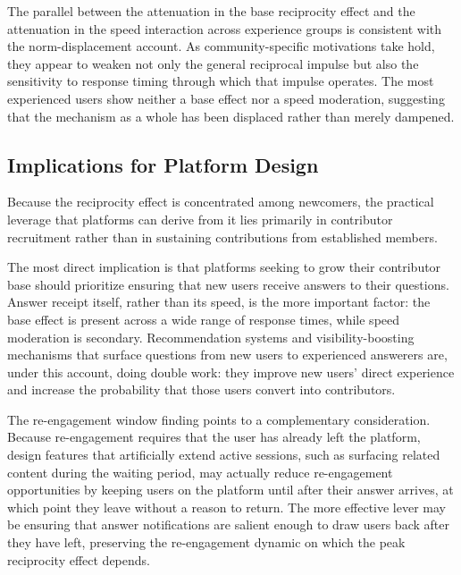The parallel between the attenuation in the base reciprocity effect and the attenuation in the 
speed interaction across experience groups is consistent with the norm-displacement account. As 
community-specific motivations take hold, they appear to weaken not only the general reciprocal 
impulse but also the sensitivity to response timing through which that impulse operates. The most 
experienced users show neither a base effect nor a speed moderation, suggesting that the mechanism 
as a whole has been displaced rather than merely dampened.

\subsection{Implications for Platform Design}

Because the reciprocity effect is concentrated among newcomers, the practical leverage that platforms can derive from it lies primarily in contributor recruitment rather than in sustaining contributions from established members.

The most direct implication is that platforms seeking to grow their contributor base should prioritize ensuring that new users receive answers to their questions. Answer receipt itself, rather than its speed, is the more important factor: the base effect is present across a wide range of response times, while speed moderation is secondary. Recommendation systems and visibility-boosting mechanisms that surface questions from new users to experienced answerers are, under this account, doing double work: they improve new users' direct experience and increase the probability that those users convert into contributors.

The re-engagement window finding points to a complementary consideration. Because re-engagement requires that the user has already left the platform, design features that artificially extend active sessions, such as surfacing related content during the waiting period, may actually reduce re-engagement opportunities by keeping users on the platform until after their answer arrives, at which point they leave without a reason to return. The more effective lever may be ensuring that answer notifications are salient enough to draw users back after they have left, preserving the re-engagement dynamic on which the peak reciprocity effect depends.


